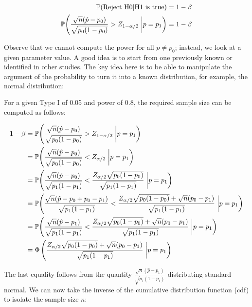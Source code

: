 \documentclass[]{book}
\begin{document}
\begin{align*}
\mathbb{P}{(\mbox{Reject H0}|\mbox{H1 is true})} & = 1-\beta \\
\mathbb{P}{\left(\frac{\sqrt{n}(\hat p - p_0)}{\sqrt{p_0(1-p_0)}} > Z_{1-\alpha/2}\right.\left|\vphantom{\frac{1}{2}}p = p_1\right)} & = 1 - \beta
\end{align*}

Observe that we cannot compute the power for all \(p\neq p_0\); instead, we look at a given parameter value. A good idea is to start from one previously known or identified in other studies. The key idea here is to be able to manipulate the argument of the probability to turn it into a known distribution, for example, the normal distribution:

For a given Type I of 0.05 and power of 0.8, the required sample size can be computed as follows:

\begin{align*}
1 - \beta & = \mathbb{P}{\left(\frac{\sqrt{n}(\hat p - p_0)}{\sqrt{p_0(1-p_0)}} > Z_{1-\alpha/2}\right.\left|\vphantom{\frac{1}{2}}p = p_1\right)} \\
& = \mathbb{P}{\left(\frac{\sqrt{n}(\hat p - p_0)}{\sqrt{p_0(1-p_0)}} < Z_{\alpha/2}\right.\left|\vphantom{\frac{1}{2}}p = p_1\right)} \\
& = \mathbb{P}{\left(\frac{\sqrt{n}(\hat p - p_0)}{\sqrt{p_1(1-p_1)}} < \frac{Z_{\alpha/2}\sqrt{p_0(1-p_0)}}{\sqrt{p_1(1-p_1)}}\right.\left|\vphantom{\frac{1}{2}}p = p_1\right)} \\
& = \mathbb{P}{\left(\frac{\sqrt{n}(\hat p - p_0 + p_0 - p_1)}{\sqrt{p_1(1-p_1)}} < \frac{Z_{\alpha/2}\sqrt{p_0(1-p_0)} + \sqrt{n}(p_0 - p_1)}{\sqrt{p_1(1-p_1)}}\right.\left|\vphantom{\frac{1}{2}}p = p_1\right)} \\
& = \mathbb{P}{\left(\frac{\sqrt{n}(\hat p - p_1)}{\sqrt{p_1(1-p_1)}} < \frac{Z_{\alpha/2}\sqrt{p_0(1-p_0)} + \sqrt{n}(p_0 - p_1)}{\sqrt{p_1(1-p_1)}}\right.\left|\vphantom{\frac{1}{2}}p = p_1\right)} \\
& = \Phi\left(\frac{Z_{\alpha/2}\sqrt{p_0(1-p_0)} + \sqrt{n}(p_0 - p_1)}{\sqrt{p_1(1-p_1)}}\right.\left|\vphantom{\frac{1}{2}}p = p_1\right) \\
\end{align*}

The last equality follows from the quantity \(\frac{\sqrt{n}(\hat p - p_1)}{\sqrt{p_1(1-p_1)}}\) distributing standard normal. We can now take the inverse of the cumulative distribution function (cdf) to isolate the sample size \(n\):
\end{document}
